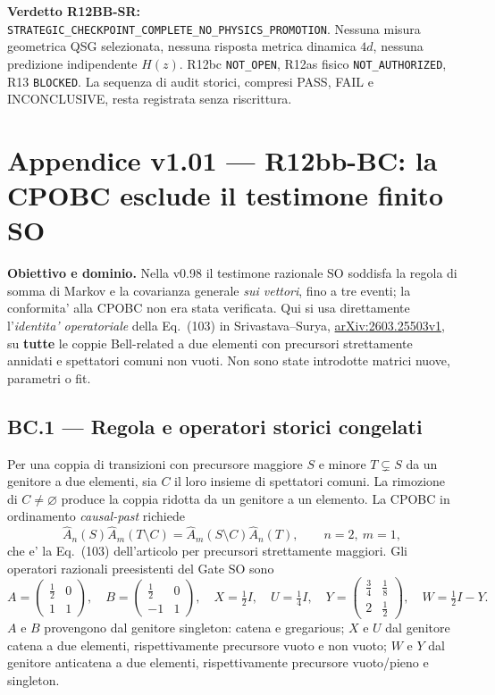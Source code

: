 \documentclass[11pt,a4paper]{article}
\begin{document}
\textbf{Verdetto R12BB-SR:} \texttt{STRATEGIC\_CHECKPOINT\_COMPLETE\_NO\_PHYSICS\_PROMOTION}. Nessuna misura geometrica QSG selezionata, nessuna risposta metrica dinamica $4d$, nessuna predizione indipendente $H(z)$. R12bc \texttt{NOT\_OPEN}, R12as fisico \texttt{NOT\_AUTHORIZED}, R13 \texttt{BLOCKED}. La sequenza di audit storici, compresi PASS, FAIL e INCONCLUSIVE, resta registrata senza riscrittura.
\endgroup

\clearpage
\begingroup
\setlength{\parskip}{0.18em}
\section*{Appendice v1.01 --- R12bb-BC: la CPOBC esclude il testimone finito SO}
\textbf{Obiettivo e dominio.} Nella v0.98 il testimone razionale SO soddisfa la regola di somma di Markov e la covarianza generale \emph{sui vettori}, fino a tre eventi; la conformita' alla CPOBC non era stata verificata. Qui si usa direttamente l'\emph{identita' operatoriale} della Eq.~(103) in Srivastava--Surya, \href{https://arxiv.org/pdf/2603.25503}{arXiv:2603.25503v1}, su \textbf{tutte} le coppie Bell-related a due elementi con precursori strettamente annidati e spettatori comuni non vuoti. Non sono state introdotte matrici nuove, parametri o fit.

\subsection*{BC.1 --- Regola e operatori storici congelati}
Per una coppia di transizioni con precursore maggiore $S$ e minore $T\subsetneq S$ da un genitore a due elementi, sia $C$ il loro insieme di spettatori comuni. La rimozione di $C\ne\varnothing$ produce la coppia ridotta da un genitore a un elemento. La CPOBC in ordinamento \emph{causal-past} richiede
\begin{equation}
\widehat A_n(S)\widehat A_m(T\setminus C)
=\widehat A_m(S\setminus C)\widehat A_n(T),\qquad n=2,\ m=1,\tag{BC.1}
\end{equation}
che e' la Eq.~(103) dell'articolo per precursori strettamente maggiori. Gli operatori razionali preesistenti del Gate SO sono
\begin{equation}
A=\begin{pmatrix}\frac12&0\\1&1\end{pmatrix},\quad
B=\begin{pmatrix}\frac12&0\\-1&1\end{pmatrix},\quad
X=\tfrac12I,\quad U=\tfrac14I,\quad
Y=\begin{pmatrix}\frac34&\frac18\\2&\frac12\end{pmatrix},\quad W=\tfrac12I-Y.
\tag{BC.2}
\end{equation}
$A$ e $B$ provengono dal genitore singleton: catena e gregarious; $X$ e $U$ dal genitore catena a due elementi, rispettivamente precursore vuoto e non vuoto; $W$ e $Y$ dal genitore anticatena a due elementi, rispettivamente precursore vuoto/pieno e singleton.
\end{document}
